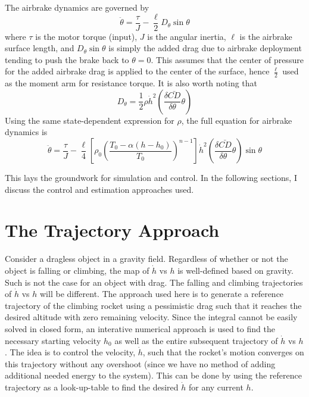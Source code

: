 \documentclass{article}
\begin{document}
  The airbrake dynamics are governed by
  \begin{equation}
    \ddot{\theta} = \frac{\tau}{J} - \frac{\ell}{2}D_\theta \sin \theta
  \end{equation}
  where $\tau$ is the motor torque (input), $J$ is the angular inertia, $\ell$ is the airbrake surface length, and $D_\theta \sin \theta$ is simply the added drag due to airbrake deployment tending to push the brake back to $\theta=0$. This assumes that the center of pressure for the added airbrake drag is applied to the center of the surface, hence $\frac{\ell}{2}$ used as the moment arm for resistance torque. It is also worth noting that
  \begin{equation}
    D_\theta = \frac{1}{2} \rho \dot{h}^2 \left(\frac{\delta\bar{CD}}{\delta\theta} \theta \right)
  \end{equation}
  Using the same state-dependent expression for $\rho$, the full equation for airbrake dynamics is
  \begin{equation}
    \ddot{\theta} = \frac{\tau}{J} - \frac{\ell}{4} \left[ \rho_0 \left(   \frac{T_0 - \alpha\left( h-h_0 \right)}{T_0}   \right)^{n-1} \right] \dot{h}^2 \left(\frac{\delta\bar{CD}}{\delta\theta} \theta \right) \sin \theta
  \end{equation}

  This lays the groundwork for simulation and control. In the following sections, I discuss the control and estimation approaches used.

\section{The Trajectory Approach}
  Consider a dragless object in a gravity field. Regardless of whether or not the object is falling or climbing, the map of $\dot{h}$ vs $h$ is well-defined based on gravity. Such is not the case for an object with drag. The falling and climbing trajectories of $\dot{h}$ vs $h$ will be different. The approach used here is to generate a reference trajectory of the climbing rocket using a pessimistic drag such that it reaches the desired altitude with zero remaining velocity. Since the integral cannot be easily solved in closed form, an interative numerical approach is used to find the necessary starting velocity $h_0$ as well as the entire subsequent trajectory of $\dot{h}$ vs $h$. The idea is to control the velocity, $\dot{h}$, such that the rocket's motion converges on this trajectory without any overshoot (since we have no method of adding additional needed energy to the system). This can be done by using the reference trajectory as a look-up-table to find the desired $\dot{h}$ for any current $h$.
\end{document}
